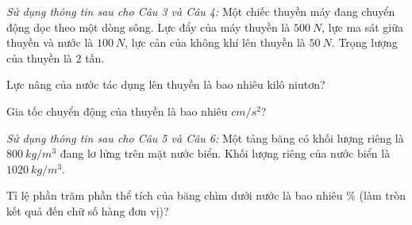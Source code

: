 \textit{Sử dụng thông tin sau cho Câu 3 và Câu 4:} Một chiếc thuyền máy đang chuyển động dọc theo một dòng sông. Lực đẩy của máy thuyền là $500\ N$, lực ma sát giữa thuyền và nước là $100\ N$, lực cản của không khí lên thuyền là $50\ N$. Trọng lượng của thuyền là $2$ tấn.
\begin{ex}%
Lực nâng của nước tác dụng lên thuyền là bao nhiêu kilô niutơn?
\end{ex}
\begin{ex}%
Gia tốc chuyển động của thuyền là bao nhiêu $cm/s^2$?
 \end{ex}
\textit{Sử dụng thông tin sau cho Câu 5 và Câu 6:} Một tảng băng có khối lượng riêng là $800 \ kg/m^3$ đang lơ lửng trên mặt nước biển. Khối lượng riêng của nước biển là $1020 \ kg/m^3$.
\begin{ex}%
Tỉ lệ phần trăm phần thể tích của băng chìm dưới nước là bao nhiêu $\%$ (làm tròn kết quả đến chữ số hàng đơn vị)?
\end{ex}
